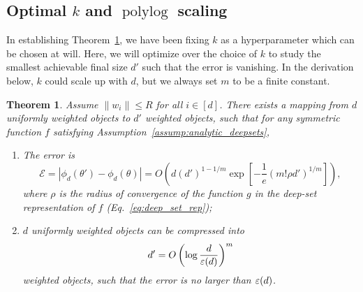 \documentclass{article}
\theoremstyle{plain}
\newtheorem{theorem}{Theorem}
\def\REV#1{{\color[HTML]{000000}#1}}
\begin{document}
\subsection{Optimal $k$ and $\operatorname{polylog}$ scaling}\label{app sec: optimal k}

In establishing Theorem~\ref{thm:errorbound_polylog}, we have been fixing $k$ as a hyperparameter which can be chosen at will. Here, we will optimize over the choice of $k$ to study the smallest achievable final size $d'$ such that the error is vanishing. In the derivation below, $k$ could scale up with $d$, but we always set $m$ to be a finite constant. 

\begin{theorem} \label{thm:errorbound_polylog}
    Assume $\|w_i\|\leq R$ for all $i\in[d]$. There exists a mapping from $d$ uniformly weighted objects to $d'$ weighted objects, such that for any symmetric function $f$ satisfying Assumption~\ref{assump:analytic_deepsets}, 
    \begin{enumerate}
        \item The error is 
        \begin{equation}
            \mathcal{E} = \left| \phi_d(\theta') - \phi_d(\theta) \right| = O\left( d (d')^{1-1/m} \exp\left[ -\frac{1}{e}(m!\rho d')^{1/m} \right] \right)    ,
        \end{equation}
        where $\rho$ is the radius of convergence of the function $g$ in the deep-set representation of $f$ (Eq.~\eqref{eq:deep_set_rep});  
        \item $d$ uniformly weighted objects can be compressed into     
        \begin{equation}    \label{eq:optimal_dprime}
            d' = O\left( \log\frac{d}{\REV{\varepsilon}(d)} \right)^m
        \end{equation}
        weighted objects, such that the error is no larger than $\REV{\varepsilon}(d)$. 
    \end{enumerate}
\end{theorem}
\end{document}
